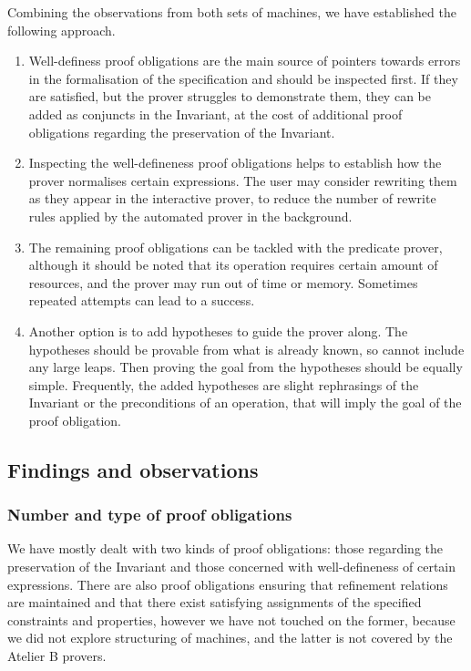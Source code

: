 \documentclass[12pt,journal,duplex]{IEEEtran}
\begin{document}
	Combining the observations from both sets of machines, we have established the following approach.
	\begin{enumerate}
		\item	Well-definess proof obligations are the main source of pointers towards errors in the formalisation of the specification and should be inspected first. If they are satisfied, but the prover struggles to demonstrate them, they can be added as conjuncts in the Invariant, at the cost of additional proof obligations regarding the preservation of the Invariant.

		\item Inspecting the well-defineness proof obligations helps to establish how the prover normalises certain expressions. The user may consider rewriting them as they appear in the interactive prover, to reduce the number of rewrite rules applied by the automated prover in the background.

		\item The remaining proof obligations can be tackled with the predicate prover, although it should be noted that its operation requires certain amount of resources, and the prover may run out of time or memory. Sometimes repeated attempts can lead to a success.

		\item Another option is to add hypotheses to guide the prover along. The hypotheses should be provable from what is already known, so cannot include any large leaps. Then proving the goal from the hypotheses should be equally simple. Frequently, the added hypotheses are slight rephrasings of the Invariant or the preconditions of an operation, that will imply the goal of the proof obligation.
  \end{enumerate}

	\subsection{Findings and observations}
	\subsubsection{Number and type of proof obligations}
	We have mostly dealt with two kinds of proof obligations: those regarding the preservation of the Invariant and those concerned with well-defineness of certain expressions. There are also proof obligations ensuring that refinement relations are maintained and that there exist satisfying assignments of the specified constraints and properties\cite{Sekerinski}, however we have not touched on the former, because we did not explore structuring of machines, and the latter is not covered by the Atelier B provers.
\end{document}
